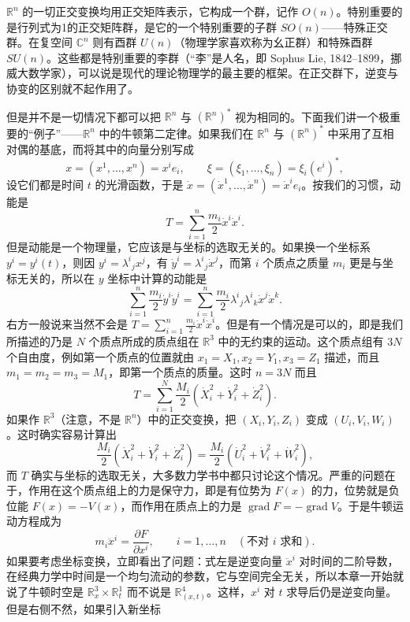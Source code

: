 $\mathbb R^n$ 的一切正交变换均用正交矩阵表示，它构成一个群，记作 $O(n)$。特别重要的是行列式为1的正交矩阵群，是它的一个特别重要的子群 $SO(n)$——特殊正交群。在复空间 $\mathbb C^n$ 则有酉群 $U(n)$（物理学家喜欢称为幺正群）和特殊酉群 $SU(n)$。这些都是特别重要的李群（“李”是人名，即 Sophus Lie, 1842--1899，挪威大数学家），可以说是现代的理论物理学的最主要的框架。在正交群下，逆变与协变的区别就不起作用了。

但是并不是一切情况下都可以把 $\mathbb R^n$ 与 $(\mathbb R^n)^*$ 视为相同的。下面我们讲一个极重要的“例子”——$\mathbb R^n$ 中的牛顿第二定律。如果我们在 $\mathbb R^n$ 与 $(\mathbb R^n)^*$ 中采用了互相对偶的基底，而将其中的向量分别写成
\[
 x=(x^1,\ldots,x^n)=x^i e_i,
 \qquad
 \xi=(\xi_1,\ldots,\xi_n)=\xi_i(e^i)^*,
\]
设它们都是时间 $t$ 的光滑函数，于是 $\dot x=(\dot x^1,\ldots,\dot x^n)=\dot x^i e_i$。按我们的习惯，动能是
\[
 T=\sum_{i=1}^n\frac{m_i}{2}\dot x^i\dot x^i.
\]
但是动能是一个物理量，它应该是与坐标的选取无关的。如果换一个坐标系 $y^i=y^i(t)$，则因 $y^i=\lambda^i{}_j x^j$，有 $\dot y^i=\lambda^i{}_j\dot x^j$，而第 $i$ 个质点之质量 $m_i$ 更是与坐标无关的，所以在 $y$ 坐标中计算的动能是
\begin{equation}
 \sum_{i=1}^n\frac{m_i}{2}\dot y^i\dot y^i
 =\sum_{i=1}^n\frac{m_i}{2}\lambda^i{}_j\lambda^i{}_k\dot x^j\dot x^k.
 \tag{15}
\end{equation}
右方一般说来当然不会是 $T=\sum_{i=1}^n\frac{m_i}{2}\dot x^i\dot x^i$。但是有一个情况是可以的，即是我们所描述的乃是 $N$ 个质点所成的质点组在 $\mathbb R^3$ 中的无约束的运动。这个质点组有 $3N$ 个自由度，例如第一个质点的位置就由 $x_1=X_1,x_2=Y_1,x_3=Z_1$ 描述，而且 $m_1=m_2=m_3=M_1$，即第一个质点的质量。这时 $n=3N$ 而且
\[
 T=\sum_{i=1}^N\frac{M_i}{2}(\dot X_i^2+\dot Y_i^2+\dot Z_i^2).
\]
如果作 $\mathbb R^3$（注意，不是 $\mathbb R^n$）中的正交变换，把
$(X_i,Y_i,Z_i)$ 变成 $(U_i,V_i,W_i)$。这时确实容易计算出
\[
 \frac{M_i}{2}(\dot X_i^2+\dot Y_i^2+\dot Z_i^2)
 =\frac{M_i}{2}(\dot U_i^2+\dot V_i^2+\dot W_i^2),
\]
而 $T$ 确实与坐标的选取无关，大多数力学书中都只讨论这个情况。严重的问题在于，作用在这个质点组上的力是保守力，即是有位势为 $F(x)$ 的力，位势就是负位能 $F(x)=-V(x)$，而作用在质点上的力是 $\operatorname{grad}F=-\operatorname{grad}V$。于是牛顿运动方程成为
\begin{equation}
 m_i\ddot x^i=\frac{\partial F}{\partial x^i},\qquad i=1,\ldots,n
 \quad(\text{不对 }i\text{ 求和}).
 \tag{16}
\end{equation}
如果要考虑坐标变换，立即看出了问题：式左是逆变向量 $\ddot x^i$ 对时间的二阶导数，在经典力学中时间是一个均匀流动的参数，它与空间完全无关，所以本章一开始就说了牛顿时空是 $\mathbb R_x^3\times\mathbb R_t^1$ 而不说是 $\mathbb R^4_{(x,t)}$。这样，$x^i$ 对 $t$ 求导后仍是逆变向量。但是右侧不然，如果引入新坐标
